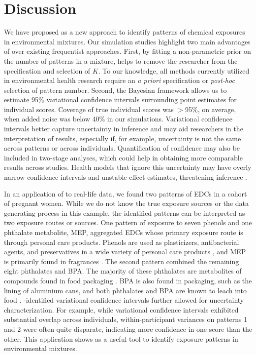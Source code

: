 \section{Discussion}

We have proposed \bnmf as a new approach to identify patterns of chemical exposures in environmental mixtures. Our simulation studies highlight two main advantages of \bnmf over existing frequentist approaches. First, by fitting a non-parametric prior on the number of patterns in a mixture, \bnmf helps to remove the researcher from the specification and selection of $K$. To our knowledge, all methods currently utilized in environmental health research require an \textit{a priori} specification or \textit{post-hoc} selection of pattern number. Second, the Bayesian framework allows us to estimate 95\% variational confidence intervals surrounding point estimates for individual scores. Coverage of true individual scores was $>$95\%, on average, when added noise was below 40\% in our simulations. Variational confidence intervals better capture uncertainty in inference and may aid researchers in the interpretation of results, especially if, for example, uncertainty is not the same across patterns or across individuals. Quantification of confidence may also be included in two-stage analyses, which could help in obtaining more comparable results across studies. Health models that ignore this uncertainty may have overly narrow confidence intervals and unstable effect estimates, threatening inference \citep{mak14_unc}.

In an application of \bnmf to real-life data, we found two patterns of EDCs in a cohort of pregnant women. While we do not know the true exposure sources or the data generating process in this example, the identified patterns can be interpreted as two exposure routes or sources. One pattern of exposure to seven phenols and one phthalate metabolite, MEP, aggregated EDCs whose primary exposure route is through personal care products. Phenols are used as plasticizers, antibacterial agents, and preservatives in a wide variety of personal care products \citep{philippat2015exposure}, and MEP is primarily found in fragrances \citep{koniecki2011phthalates}. The second pattern combined the remaining eight phthalates and BPA. The majority of these phthalates are metabolites of compounds found in food packaging \citep{schettler2006human}. BPA is also found in packaging, such as the lining of aluminium cans, and both phthalates and BPA are known to leach into food \citep{vandenberg2007human}. \bnmfc-identified variational confidence intervals further allowed for uncertainty characterization. For example, while variational confidence intervals exhibited substantial overlap across individuals, within-participant variances on patterns 1 and 2 were often quite disparate, indicating more confidence in one score than the other. This application shows \bnmf as a useful tool to identify exposure patterns in environmental mixtures. 

